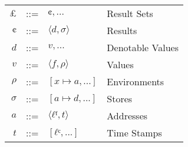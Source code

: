 \documentclass[12pt, oneside]{book}
\begin{document}
\begin{tabular}{rcll}
  \(£\) & ::= & \({¢, ...}\)     & Result Sets      \\
  \(¢\) & ::= & \(⟨d, σ⟩\)       & Results          \\
  \(d\) & ::= & \({v, ...}\)     & Denotable Values \\
  \(v\) & ::= & \(⟨f, ρ⟩\)       & Values           \\
  \(ρ\) & ::= & \([x ↦ a, ...]\) & Environments     \\
  \(σ\) & ::= & \([a ↦ d, ...]\) & Stores           \\
  \(a\) & ::= & \(⟨ℓᶠ, t⟩\)      & Addresses        \\
  \(t\) & ::= & \([ℓᶜ, ...]\)    & Time Stamps      \\
\end{tabular}
\end{document}

